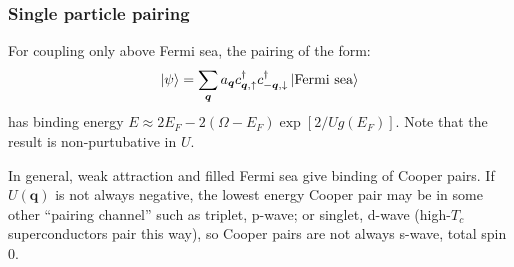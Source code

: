 \documentclass[11pt,letterpaper]{article}
\numberwithin{equation}{section} %
\renewcommand*{\vec}[1]{\bm{#1}}
\newcommand{\spind}{\ensuremath{\downarrow}}
\newcommand{\spinu}{\ensuremath{\uparrow}}
\begin{document}
\subsubsection{Single particle pairing}
\label{ssub:Simgle particle pairing}
For coupling only above Fermi sea, the pairing of the form: 
\begin{equation}
	\ket{\psi} = \sum_{\vec q} a_{\vec q} c_{\vec q,\spinu}^\dagger
	c_{-\vec q, \spind}^\dagger \ket{\mbox{Fermi sea}}
\end{equation}
has binding energy $E \approx 2 E_F - 2(\Omega - E_F)\exp[2/Ug(E_F)]$. Note
that the result is non-purtubative in $U$. 

In general, weak attraction and filled Fermi sea give binding of Cooper
pairs. If $U(\vec q)$ is not always negative, the lowest energy Cooper pair
may be in some other ``pairing channel'' such as triplet, p-wave; or singlet,
d-wave (high-$T_c$ superconductors pair this way), so Cooper pairs are not
always s-wave, total spin $0$.  
\end{document}
